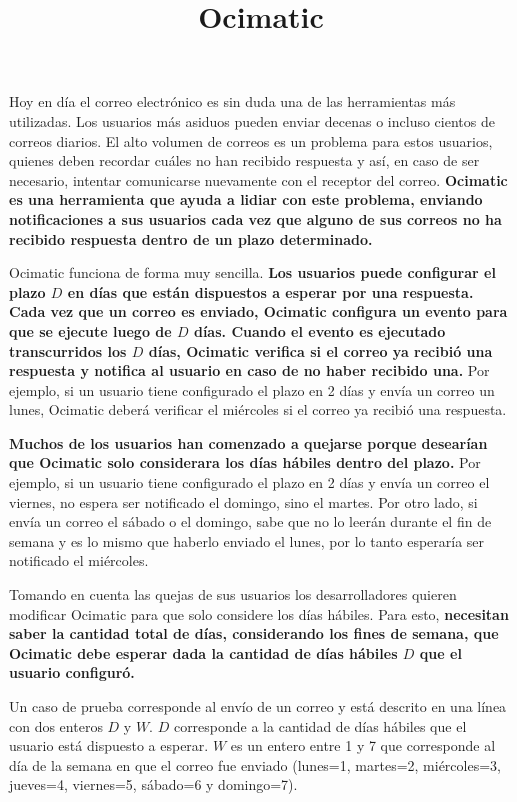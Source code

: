\documentclass{oci}
\title{Ocimatic}
\begin{document}
\begin{problemDescription}
  Hoy en día el correo electrónico es sin duda una de las herramientas más
  utilizadas.
  Los usuarios más asiduos pueden enviar decenas o incluso cientos de correos
  diarios.
  El alto volumen de correos es un problema para estos usuarios, quienes deben
  recordar cuáles no han recibido respuesta y así, en caso de ser necesario,
  intentar comunicarse nuevamente con el receptor del correo.
  \textbf{Ocimatic es una herramienta que ayuda a lidiar con este problema, enviando
  notificaciones a sus usuarios cada vez que alguno de sus correos no ha
  recibido respuesta dentro de un plazo determinado.}
  
  Ocimatic funciona de forma muy sencilla.
  \textbf{
  Los usuarios puede configurar el plazo $D$ en días que están dispuestos a
  esperar por una respuesta.
  Cada vez que un correo es enviado, Ocimatic configura un evento para que se
  ejecute luego de $D$ días.
  Cuando el evento es ejecutado transcurridos los $D$ días, Ocimatic verifica
  si el correo ya recibió una respuesta y notifica al usuario en caso de no
  haber recibido una.}
  Por ejemplo, si un usuario tiene configurado el plazo en 2 días y envía un
  correo un lunes, Ocimatic deberá verificar el miércoles si el correo ya recibió
  una respuesta.

  \textbf{Muchos de los usuarios han comenzado a quejarse porque desearían que Ocimatic
  solo considerara los días hábiles dentro del plazo.}
  Por ejemplo, si un usuario tiene configurado el plazo en 2 días y envía un
  correo el viernes, no espera ser notificado el domingo, sino el martes.
  Por otro lado, si envía un correo el sábado o el domingo, sabe que no lo
  leerán durante el fin de semana y es lo mismo que haberlo enviado el lunes,
  por lo tanto esperaría ser notificado el miércoles.

  Tomando en cuenta las quejas de sus usuarios los desarrolladores quieren
  modificar Ocimatic para que solo considere los días hábiles.
  Para esto, \textbf{necesitan saber la cantidad total de días, considerando los fines
  de semana, que Ocimatic debe esperar dada la cantidad de días hábiles $D$ que
  el usuario configuró.}
\end{problemDescription}

\begin{inputDescription}
  Un caso de prueba corresponde al envío de un correo y está descrito en una
  línea con dos enteros $D$ y $W$.
  $D$ corresponde a la cantidad de días hábiles que el usuario está dispuesto a
  esperar.
  $W$ es un entero entre 1 y 7 que corresponde al día de la semana en que el
  correo fue enviado (lunes=1, martes=2, miércoles=3, jueves=4, viernes=5,
  sábado=6 y domingo=7).
\end{inputDescription}
\end{document}
